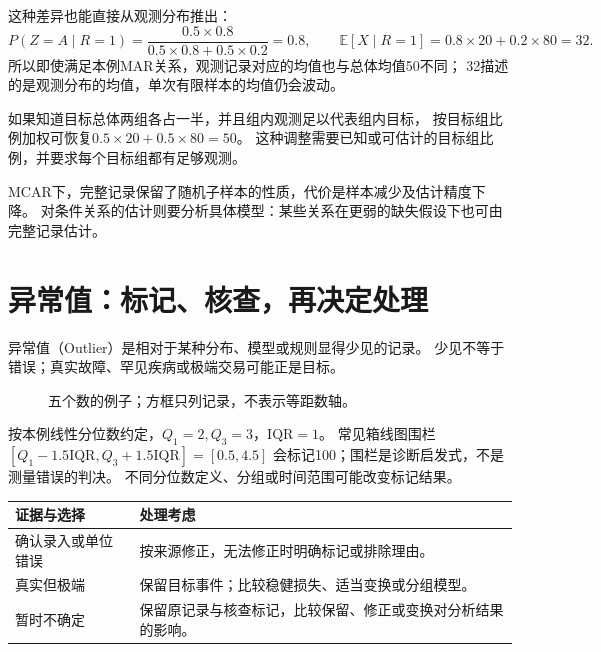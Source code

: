 这种差异也能直接从观测分布推出：
\[
 P(Z=A\mid R=1)=\frac{0.5\times0.8}{0.5\times0.8+0.5\times0.2}=0.8,
 \qquad\mathbb E[X\mid R=1]=0.8\times20+0.2\times80=32.
\]
所以即使满足本例MAR关系，观测记录对应的均值也与总体均值50不同；
32描述的是观测分布的均值，单次有限样本的均值仍会波动。

如果知道目标总体两组各占一半，并且组内观测足以代表组内目标，
按目标组比例加权可恢复$0.5\times20+0.5\times80=50$。
这种调整需要已知或可估计的目标组比例，并要求每个目标组都有足够观测。

MCAR下，完整记录保留了随机子样本的性质，代价是样本减少及估计精度下降。
对条件关系的估计则要分析具体模型：某些关系在更弱的缺失假设下也可由完整记录估计。


\section{异常值：标记、核查，再决定处理}
\label{sec:reliability-outlier}
异常值（Outlier）是相对于某种分布、模型或规则显得少见的记录。
少见不等于错误；真实故障、罕见疾病或极端交易可能正是目标。

\begin{figure}[htbp]
\centering
\caption{五个数的例子；方框只列记录，不表示等距数轴。}
\par\smallskip
{}
\end{figure}

按本例线性分位数约定，$Q_1=2,Q_3=3$，$\mathrm{IQR}=1$。
常见箱线图围栏$[Q_1-1.5\mathrm{IQR},Q_3+1.5\mathrm{IQR}]=[0.5,4.5]$
会标记100；围栏是诊断启发式，不是测量错误的判决。
不同分位数定义、分组或时间范围可能改变标记结果。

\begin{center}
\begin{tabularx}{\textwidth}{P{29mm}Y}
\toprule
证据与选择 & 处理考虑\\
\midrule
确认录入或单位错误 & 按来源修正，无法修正时明确标记或排除理由。\\
真实但极端 & 保留目标事件；比较稳健损失、适当变换或分组模型。\\
暂时不确定 & 保留原记录与核查标记，比较保留、修正或变换对分析结果的影响。\\
\bottomrule
\end{tabularx}
\end{center}

